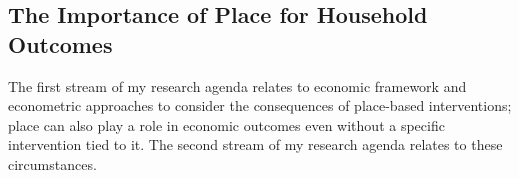 


\subsection{The Importance of Place for Household Outcomes}


The first stream of my research agenda relates to economic framework and econometric approaches to consider the consequences of place-based interventions; place can also play a role in economic outcomes even without a specific intervention tied to it. The second stream of my research agenda relates to these circumstances.

